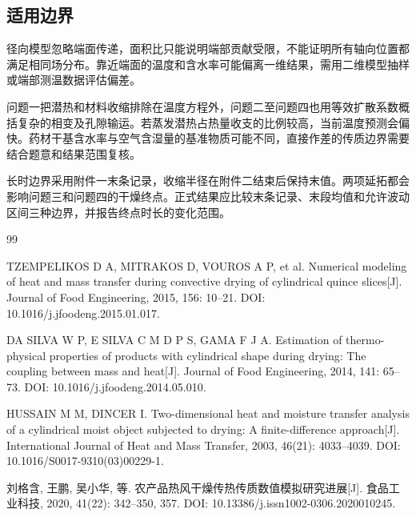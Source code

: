 \documentclass[withoutpreface,bwprint]{cumcmthesis}
\begin{document}
\subsection{适用边界}

径向模型忽略端面传递，面积比只能说明端部贡献受限，不能证明所有轴向位置都满足相同场分布。靠近端面的温度和含水率可能偏离一维结果，需用二维模型抽样或端部测温数据评估偏差。

问题一把潜热和材料收缩排除在温度方程外，问题二至问题四也用等效扩散系数概括复杂的相变及孔隙输运。若蒸发潜热占热量收支的比例较高，当前温度预测会偏快。药材干基含水率与空气含湿量的基准物质可能不同，直接作差的传质边界需要结合题意和结果范围复核。

长时边界采用附件一末条记录，收缩半径在附件二结束后保持末值。两项延拓都会影响问题三和问题四的干燥终点。正式结果应比较末条记录、末段均值和允许波动区间三种边界，并报告终点时长的变化范围。



\begingroup
\raggedright
\begin{thebibliography}{99}

TZEMPELIKOS D A, MITRAKOS D, VOUROS A P, et al.
Numerical modeling of heat and mass transfer during convective drying of cylindrical quince slices[J].
Journal of Food Engineering, 2015, 156: 10--21.
DOI: 10.1016/j.jfoodeng.2015.01.017.

DA SILVA W P, E SILVA C M D P S, GAMA F J A.
Estimation of thermo-physical properties of products with cylindrical shape during drying: The coupling between mass and heat[J].
Journal of Food Engineering, 2014, 141: 65--73.
DOI: 10.1016/j.jfoodeng.2014.05.010.

HUSSAIN M M, DINCER I.
Two-dimensional heat and moisture transfer analysis of a cylindrical moist object subjected to drying: A finite-difference approach[J].
International Journal of Heat and Mass Transfer, 2003, 46(21): 4033--4039.
DOI: 10.1016/S0017-9310(03)00229-1.

刘格含, 王鹏, 吴小华, 等.
农产品热风干燥传热传质数值模拟研究进展[J].
食品工业科技, 2020, 41(22): 342--350, 357.
DOI: 10.13386/j.issn1002-0306.2020010245.

\end{thebibliography}
\endgroup
\end{document}
